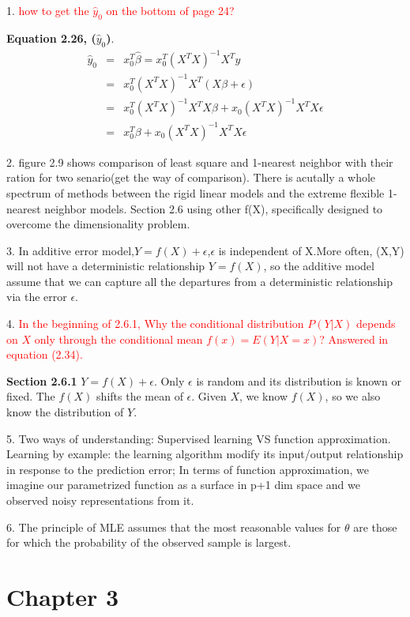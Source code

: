 \documentclass[a4paper, 12pt]{article}
\begin{document}
1. \textcolor{red}{ how to get the $\hat{y}_0$ on the bottom of page 24?}

\vspace{6pt}
\noindent \textbf{Equation 2.26, ($\hat{y}_0$)}. 
\begin{eqnarray*}
	\hat{y}_0 &=& x_0^T\hat{\beta} = x_0^T (X^TX)^{-1} X^Ty\\
	& =& x_0^T (X^TX)^{-1} X^T (X\beta + \epsilon) \\
	& = & x_0^T (X^TX)^{-1} X^T X\beta +x_0 (X^TX)^{-1} X^T X \epsilon \\
	& = & x_0^T \beta +x_0 (X^TX)^{-1} X^T X \epsilon 
\end{eqnarray*}

2. figure 2.9 shows comparison of least square and 1-nearest neighbor with their ration for two senario(get the way of comparison). There is acutally a whole spectrum of methods between the rigid linear models and the extreme flexible 1-nearest neighbor models. Section 2.6 using other f(X), specifically designed to overcome the dimensionality problem.

3. In additive error model,$Y=f(X)+\epsilon$,$\epsilon$ is independent of X.More often, (X,Y) will not have a deterministic relationship $Y=f(X)$, so the additive model assume that we can capture all the departures from a deterministic relationship via the error $\epsilon$.

4. \textcolor{red}{ 
In the beginning of 2.6.1, Why the conditional distribution  $P(Y|X)$ depends on $X$ only through the conditional mean $f(x)=E(Y|X=x)$? Answered in equation (2.34).
}

\vspace{6pt}
\noindent \textbf{Section 2.6.1}
$Y = f(X) + \epsilon$. Only $\epsilon$ is random and its distribution
is known or fixed. The $f(X)$ shifts the mean of $\epsilon$. 
Given $X$, we know $f(X)$, so we also know the distribution of $Y$. 

5. Two ways of understanding: Supervised learning VS function approximation. Learning by example: the learning algorithm modify its input/output relationship in response to the prediction error; In terms of function approximation, we imagine our parametrized function as a surface in p+1 dim space and we observed noisy representations from it.

6. The principle of MLE assumes that the most reasonable values for $\theta$ are those for which the probability of the observed sample is largest.

\section*{Chapter 3}
\end{document}
